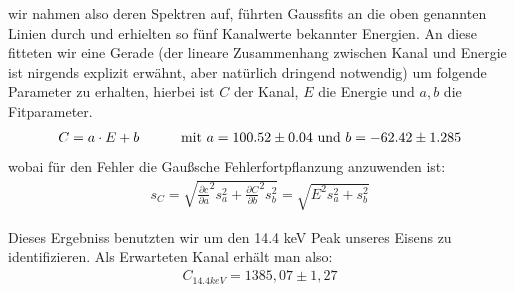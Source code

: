 \documentclass[12pt]{article}
\begin{document}
wir nahmen also deren Spektren auf, führten Gaussfits an die oben genannten Linien durch und erhielten so fünf Kanalwerte bekannter Energien. An diese fitteten 
wir eine Gerade (der lineare Zusammenhang zwischen Kanal und Energie ist nirgends explizit erwähnt, aber natürlich dringend notwendig) um folgende Parameter
zu erhalten, hierbei ist $C$ der Kanal, $E$ die Energie und $a,b$ die Fitparameter.
\begin{align*}
  C = a \cdot E + b \hspace{30pt} \textnormal{mit }a = 100.52 \pm 0.04\textnormal{ und }b =  -62.42 \pm 1.285
\end{align*}
wobai für den Fehler die Gaußsche Fehlerfortpflanzung anzuwenden ist:
\begin{align*}
  s_C = \sqrt{\frac{\partial{c}}{\partial{a}}^2 s_a^2 + \frac{\partial{C}}{\partial{b}}^2 s_b^2 } = \sqrt{E^2 s_a^2 + s_b^2}
\end{align*}

Dieses Ergebniss benutzten wir um den 14.4 keV Peak unseres Eisens zu identifizieren. Als Erwarteten Kanal erhält man also:
\begin{align*}
  C_{14.4keV} = 1385,07 \pm 1,27
\end{align*}
\end{document}
